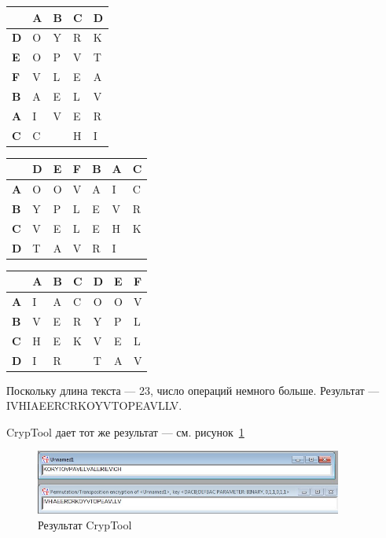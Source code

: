 \documentclass[a4paper, 14pt]{extarticle}
\begin{document}
\begin{enumerate}
\begin{table}[h]
        \begin{tabular}{@{}l|llll@{}} %
        \textbf{} & \textbf{A} & \textbf{B} & \textbf{C} & \textbf{D} \\ \midrule
        \textbf{D} & O & Y & R & K \\
        \textbf{E} & O & P & V & T \\
        \textbf{F} & V & L & E & A \\
        \textbf{B} & A & E & L & V \\
        \textbf{A} & I & V & E & R \\
        \textbf{C} & C &  & H & I
        \end{tabular}%
        \hspace{1cm}
        \begin{tabular}{@{}l|llllll@{}} %
         & \textbf{D} & \textbf{E} & \textbf{F} & \textbf{B} & \textbf{A} & \textbf{C} \\ \midrule
        \textbf{A} & O & O & V & A & I & C \\
        \textbf{B} & Y & P & L & E & V & R \\
        \textbf{C} & V & E & L & E & H & K \\
        \textbf{D} & T & A & V & R & I & 
        \end{tabular}%
        \vspace{0.5cm}
        \begin{tabular}{@{}l|llllll@{}} %
         & \textbf{A} & \textbf{B} & \textbf{C} & \textbf{D} & \textbf{E} & \textbf{F} \\ \midrule
        \textbf{A} & I & A & C & O & O & V \\
        \textbf{B} & V & E & R & Y & P & L \\
        \textbf{C} & H & E & K & V & E & L \\
        \textbf{D} & I & R &  & T & A & V
        \end{tabular}
    \end{table}

    Поскольку длина текста --- 23, число операций немного больше. Результат --- IVHIAEERCRKOYVTOPEAVLLV.\@

    CrypTool дает тот же результат --- см. рисунок~\ref{img:2:2}
    \begin{figure}[h]
        \centering
        \includegraphics[width=0.9\textwidth]{./img/S008.jpg}
        \caption{Результат CrypTool}%
        \label{img:2:2}
    \end{figure}
    

\end{enumerate}
\end{document}
